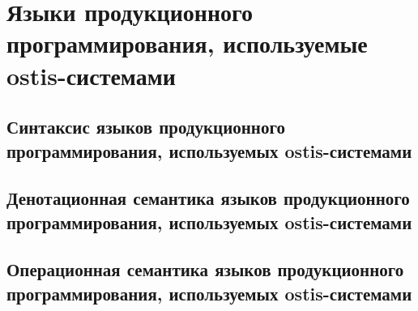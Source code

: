 \section{Языки продукционного программирования, используемые ostis-системами}
\subsection{Синтаксис языков продукционного программирования, используемых ostis-системами}
\subsection{Денотационная семантика языков продукционного программирования, используемых ostis-системами}
\subsection{Операционная семантика языков продукционного программирования, используемых ostis-системами}

%